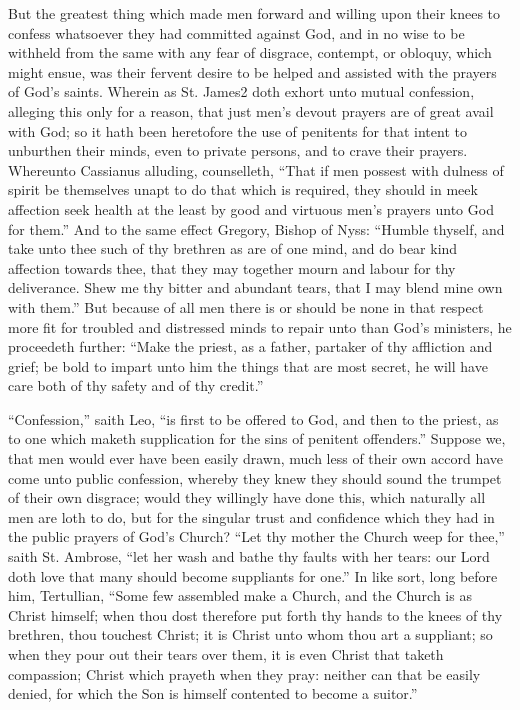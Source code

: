 But the greatest thing which made men forward and willing upon their knees to confess whatsoever they had committed against God, and in no wise to be withheld from the same with any fear of disgrace, contempt, or obloquy, which might ensue, was their fervent desire to be helped and assisted with the prayers of God’s saints. Wherein as St. James2 doth exhort unto mutual confession, alleging this only for a reason, that just men’s devout prayers are of great avail with God; so it hath been heretofore the use of penitents for that intent to unburthen their minds, even to private persons, and to crave their prayers. Whereunto Cassianus alluding, counselleth, “That if men possest with dulness of spirit be themselves unapt to do that which is required, they should in meek affection seek health at the least by good and virtuous men’s prayers unto God for them.” And to the same effect Gregory, Bishop of Nyss: “Humble thyself, and take unto thee such of thy brethren as are of one mind, and do bear kind affection towards thee, that they may together mourn and labour for thy deliverance. Shew me thy bitter and abundant tears, that I may blend mine own with them.” But because of all men there is or should be none in that respect more fit for troubled and distressed minds to repair unto than God’s ministers, he proceedeth further: “Make the priest, as a father, partaker of thy affliction and grief; be bold to impart unto him the things that are most secret, he will have care both of thy safety and of thy credit.”


“Confession,” saith Leo, “is first to be offered to God, and then to the priest, as to one which maketh supplication for the sins of penitent offenders.” Suppose we, that men would ever have been easily drawn, much less of their own accord have come unto public confession, whereby they knew they should sound the trumpet of their own disgrace; would they willingly have done this, which naturally all men are loth to do, but for the singular trust and confidence which they had in the public prayers of God’s Church? “Let thy mother the Church weep for thee,” saith St. Ambrose, “let her wash and bathe thy faults with her tears: our Lord doth love that many should become suppliants for one.” In like sort, long before him, Tertullian, “Some few assembled make a Church, and the Church is as Christ himself; when thou dost therefore put forth thy hands to the knees of thy brethren, thou touchest Christ; it is Christ unto whom thou art a suppliant; so when they pour out their tears over them, it is even Christ that taketh compassion; Christ which prayeth when they pray: neither can that be easily denied, for which the Son is himself contented to become a suitor.”

